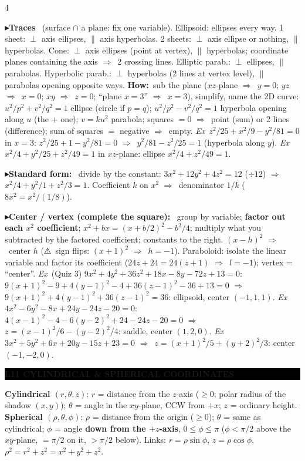 \documentclass{article}
\newcommand\hd[1]{\par\vspace{0.5pt}\needspace{4\baselineskip}\noindent
  {\setlength\fboxsep{0.45pt}\colorbox{black}{\parbox{\dimexpr\linewidth-2\fboxsep}{\color{white}\bfseries #1}}}\par\nobreak\vspace{0.2pt}\nobreak}
\newcommand\pt[1]{\par\textbf{{\symf ▸}#1}\ }  %
\newcommand\ex{\textit{Ex}\ }                  %
\newcommand\how{\textbf{How:}\ }
\newcommand\warn{{\symf ⚠}}                    %
\newcommand\then{\ensuremath{\Rightarrow}}
\begin{document}
\begin{multicols*}{4}
\pt{Traces} (surface $\cap$ a plane: fix one variable). Ellipsoid: ellipses every way. 1 sheet: $\perp$ axis ellipses, $\parallel$ axis hyperbolas. 2 sheets: $\perp$ axis ellipse or nothing, $\parallel$ hyperbolas. Cone: $\perp$ axis ellipses (point at vertex), $\parallel$ hyperbolas; coordinate planes containing the axis \then\ 2 crossing lines. Elliptic parab.: $\perp$ ellipses, $\parallel$ parabolas. Hyperbolic parab.: $\perp$ hyperbolas (2 lines at vertex level), $\parallel$ parabolas opening opposite ways. \how sub the plane ($xz$-plane \then\ $y=0$; $yz$ \then\ $x=0$; $xy$ \then\ $z=0$; ``plane $x=3$'' \then\ $x=3$), simplify, name the 2D curve: $u^2/p^2+v^2/q^2=1$ ellipse (circle if $p=q$); $u^2/p^2-v^2/q^2=1$ hyperbola opening along $u$ (the + one); $v=ku^2$ parabola; squares $=0$ \then\ point (sum) or 2 lines (difference); sum of squares $=$ negative \then\ empty. \ex $z^2/25+x^2/9-y^2/81=0$ in $x=3$: $z^2/25+1-y^2/81=0$ \then\ $y^2/81-z^2/25=1$ (hyperbola along $y$). \ex $x^2/4+y^2/25+z^2/49=1$ in $xz$-plane: ellipse $x^2/4+z^2/49=1$.

\pt{Standard form:} divide by the constant: $3x^2+12y^2+4z^2=12$ ($\div12$) \then\ $x^2/4+y^2/1+z^2/3=1$. Coefficient $k$ on $x^2$ \then\ denominator $1/k$ ($8x^2=x^2/(1/8)$).

\pt{Center / vertex (complete the square):} group by variable; \textbf{factor out each $x^2$ coefficient}; $x^2+bx=(x+b/2)^2-b^2/4$; multiply what you subtracted by the factored coefficient; constants to the right. $(x-h)^2$ \then\ center $h$ (\warn\ sign flips: $(x+1)^2$ \then\ $h=-1$). Paraboloid: isolate the linear variable and factor its coefficient ($24z+24=24(z+1)$ \then\ $l=-1$); vertex = ``center''. \ex (Quiz 3) $9x^2+4y^2+36z^2+18x-8y-72z+13=0$: $9(x+1)^2-9+4(y-1)^2-4+36(z-1)^2-36+13=0$ \then\ $9(x+1)^2+4(y-1)^2+36(z-1)^2=36$: ellipsoid, center $(-1,1,1)$. \ex $4x^2-6y^2-8x+24y-24z-20=0$: $4(x-1)^2-4-6(y-2)^2+24-24z-20=0$ \then\ $z=(x-1)^2/6-(y-2)^2/4$: saddle, center $(1,2,0)$. \ex $3x^2+5y^2+6x+20y-15z+23=0$ \then\ $z=(x+1)^2/5+(y+2)^2/3$: center $(-1,-2,0)$.

\hd{L11 CYLINDRICAL \& SPHERICAL COORDINATES}
\textbf{Cylindrical $(r,\theta,z)$}: $r$ = distance from the $z$-axis ($\ge0$; polar radius of the shadow $(x,y)$); $\theta$ = angle in the $xy$-plane, CCW from $+x$; $z$ = ordinary height. \textbf{Spherical $(\rho,\theta,\phi)$}: $\rho$ = distance from the origin ($\ge0$); $\theta$ = same as cylindrical; $\phi$ = angle \textbf{down from the $+z$-axis}, $0\le\phi\le\pi$ ($\phi<\pi/2$ above the $xy$-plane, $=\pi/2$ on it, $>\pi/2$ below). Links: $r=\rho\sin\phi$, $z=\rho\cos\phi$, $\rho^2=r^2+z^2=x^2+y^2+z^2$.


\end{multicols*}
\end{document}
